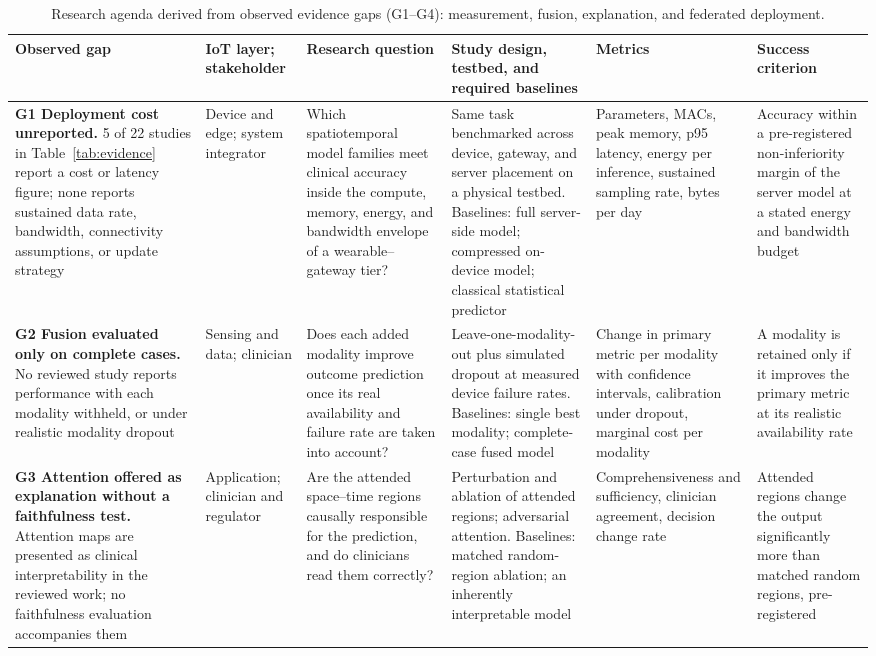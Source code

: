 \documentclass[journal]{IEEEtran}
\newif\ifsubmission
\begin{document}
\ifsubmission\else
\begin{table}[p]
\centering
\caption{Research agenda derived from observed evidence gaps (G1--G4): measurement, fusion, explanation, and federated deployment.}
\label{tab:agenda-a}
\scriptsize
\setlength{\tabcolsep}{3pt}
\renewcommand{\arraystretch}{1.12}
\begin{tabularx}{\textwidth}{>{\raggedright\arraybackslash}p{3.4cm} >{\raggedright\arraybackslash}p{1.9cm} >{\raggedright\arraybackslash}X >{\raggedright\arraybackslash}X >{\raggedright\arraybackslash}p{2.9cm} >{\raggedright\arraybackslash}p{3.0cm}}
\toprule
\textbf{Observed gap} & \textbf{IoT layer; stakeholder} & \textbf{Research question} & \textbf{Study design, testbed, and required baselines} & \textbf{Metrics} & \textbf{Success criterion} \\
\midrule
\textbf{G1 Deployment cost unreported.} 5 of 22 studies in Table~\ref{tab:evidence} report a cost or latency figure; none reports sustained data rate, bandwidth, connectivity assumptions, or update strategy & Device and edge; system integrator & Which spatiotemporal model families meet clinical accuracy inside the compute, memory, energy, and bandwidth envelope of a wearable--gateway tier? & Same task benchmarked across device, gateway, and server placement on a physical testbed. Baselines: full server-side model; compressed on-device model; classical statistical predictor & Parameters, MACs, peak memory, p95 latency, energy per inference, sustained sampling rate, bytes per day & Accuracy within a pre-registered non-inferiority margin of the server model at a stated energy and bandwidth budget \\
\addlinespace[3pt]
\textbf{G2 Fusion evaluated only on complete cases.} No reviewed study reports performance with each modality withheld, or under realistic modality dropout & Sensing and data; clinician & Does each added modality improve outcome prediction once its real availability and failure rate are taken into account? & Leave-one-modality-out plus simulated dropout at measured device failure rates. Baselines: single best modality; complete-case fused model & Change in primary metric per modality with confidence intervals, calibration under dropout, marginal cost per modality & A modality is retained only if it improves the primary metric at its realistic availability rate \\
\addlinespace[3pt]
\textbf{G3 Attention offered as explanation without a faithfulness test.} Attention maps are presented as clinical interpretability in the reviewed work; no faithfulness evaluation accompanies them & Application; clinician and regulator & Are the attended space--time regions causally responsible for the prediction, and do clinicians read them correctly? & Perturbation and ablation of attended regions; adversarial attention. Baselines: matched random-region ablation; an inherently interpretable model & Comprehensiveness and sufficiency, clinician agreement, decision change rate & Attended regions change the output significantly more than matched random regions, pre-registered \\

\end{tabularx}
\end{table}
\end{document}

